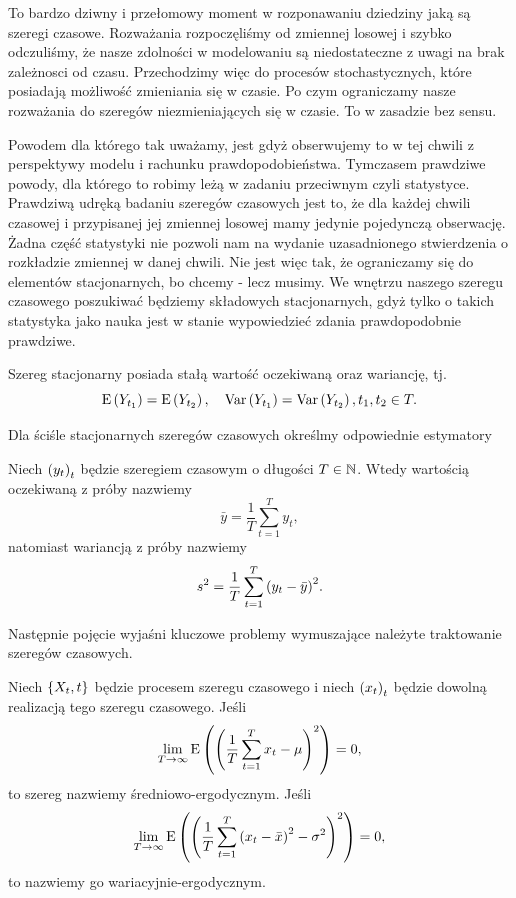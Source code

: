 \documentclass[10pt,a4paper]{book}
\begin{document}
\begin{remark*}
To bardzo dziwny i przełomowy moment w rozponawaniu dziedziny jaką są szeregi czasowe. Rozważania rozpoczęliśmy od zmiennej losowej i szybko odczuliśmy, że nasze zdolności w modelowaniu są niedostateczne z uwagi na brak zależnosci od czasu. Przechodzimy więc do procesów stochastycznych, które posiadają możliwość zmieniania się w czasie. Po czym ograniczamy nasze rozważania do szeregów niezmieniających się w czasie. To w zasadzie bez sensu. 

Powodem dla którego tak uważamy, jest gdyż obserwujemy to w tej chwili z perspektywy modelu i rachunku prawdopodobieństwa. Tymczasem prawdziwe powody, dla którego to robimy leżą w zadaniu przeciwnym czyli statystyce. Prawdziwą udręką badaniu szeregów czasowych jest to, że dla każdej chwili czasowej i przypisanej jej zmiennej losowej mamy jedynie pojedynczą obserwację. Żadna część statystyki nie pozwoli nam na wydanie uzasadnionego stwierdzenia o rozkładzie zmiennej w danej chwili. Nie jest więc tak, że ograniczamy się do elementów stacjonarnych, bo chcemy - lecz musimy. We wnętrzu naszego szeregu czasowego poszukiwać będziemy składowych stacjonarnych, gdyż tylko o takich statystyka jako nauka jest w stanie wypowiedzieć zdania prawdopodobnie prawdziwe.
\end{remark*}

\begin{proposition}
Szereg stacjonarny posiada stałą wartość oczekiwaną oraz wariancję, tj.
$$
\operatorname{E} \left({Y_{t_1}} \right) = \operatorname{E} \left({Y_{t_2}} \right) , \quad \operatorname{Var} \left( {Y_{t_1}} \right) = \operatorname{Var} \left( {Y_{t_2}} \right), t_1, t_2 \in T.
$$
\end{proposition}

Dla ściśle stacjonarnych szeregów czasowych określmy odpowiednie estymatory

\begin{definition}
Niech $\left( {y_t} \right)_{t}^{}$ będzie szeregiem czasowym o długości $T \in \mathbb{N}$. Wtedy wartością oczekiwaną z próby nazwiemy
$$
\bar{y} = \frac{1}{T} \sum_{t=1}^{T} y_t,
$$
natomiast wariancją z próby nazwiemy
$$
s^2 = \frac{1}{T} \sum_{t=1}^{T} \bracket{y_t - \bar{y}}^2.
$$
\end{definition}

Następnie pojęcie wyjaśni kluczowe problemy wymuszające należyte traktowanie szeregów czasowych.

\begin{definition}
Niech $\left\lbrace {{X_t}, {t}} \right\rbrace$ będzie procesem szeregu czasowego i niech $\left({x_t}\right)_{t}$ będzie dowolną realizacją tego szeregu czasowego. Jeśli
$$
\lim_{T \to \infty} \Ex{\bracket{ \frac{1}{T} \sum_{t=1}^{T} x_t  - \mu }^2} = 0,
$$  
to szereg nazwiemy średniowo-ergodycznym. Jeśli
$$
\lim_{T \to \infty} \Ex{\bracket{ \frac{1}{T} \sum_{t=1}^{T} \bracket{x_t - \bar{x}}^2  - \sigma^2 }^2} = 0,
$$
to nazwiemy go wariacyjnie-ergodycznym.
\end{definition}
\end{document}
